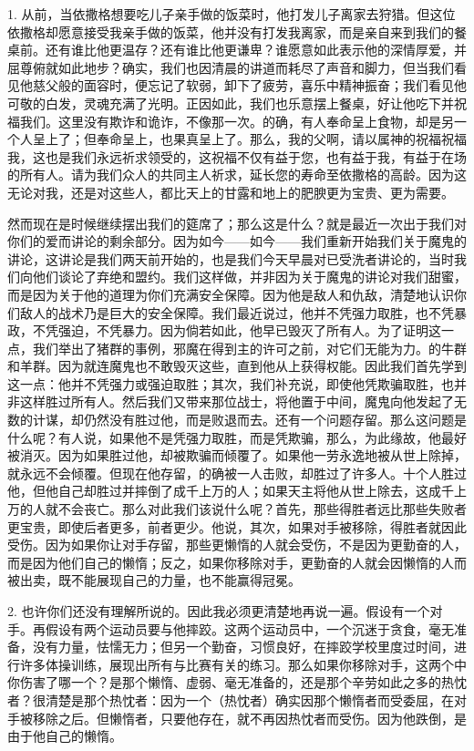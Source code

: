 1. 从前，当依撒格想要吃儿子亲手做的饭菜时，他打发儿子离家去狩猎。但这位依撒格却愿意接受我亲手做的饭菜，他并没有打发我离家，而是亲自来到我们的餐桌前。还有谁比他更温存？还有谁比他更谦卑？谁愿意如此表示他的深情厚爱，并屈尊俯就如此地步？确实，我们也因清晨的讲道而耗尽了声音和脚力，但当我们看见他慈父般的面容时，便忘记了软弱，卸下了疲劳，喜乐中精神振奋；我们看见他可敬的白发，灵魂充满了光明。正因如此，我们也乐意摆上餐桌，好让他吃下并祝福我们。这里没有欺诈和诡诈，不像那一次。的确，有人奉命呈上食物，却是另一个人呈上了；但奉命呈上，也果真呈上了。那么，我的父啊，请以属神的祝福祝福我，这也是我们永远祈求领受的，这祝福不仅有益于您，也有益于我，有益于在场的所有人。请为我们众人的共同主人祈求，延长您的寿命至依撒格的高龄。因为这无论对我，还是对这些人，都比天上的甘露和地上的肥腴更为宝贵、更为需要。\par

然而现在是时候继续摆出我们的筵席了；那么这是什么？就是最近一次出于我们对你们的爱而讲论的剩余部分。因为如今——如今——我们重新开始我们关于魔鬼的讲论，这讲论是我们两天前开始的，也是我们今天早晨对已受洗者讲论的，当时我们向他们谈论了弃绝和盟约。我们这样做，并非因为关于魔鬼的讲论对我们甜蜜，而是因为关于他的道理为你们充满安全保障。因为他是敌人和仇敌，清楚地认识你们敌人的战术乃是巨大的安全保障。我们最近说过，他并不凭强力取胜，也不凭暴政，不凭强迫，不凭暴力。因为倘若如此，他早已毁灭了所有人。为了证明这一点，我们举出了猪群的事例，邪魔在得到主的许可之前，对它们无能为力。的牛群和羊群。因为就连魔鬼也不敢毁灭这些，直到他从上获得权能。因此我们首先学到这一点：他并不凭强力或强迫取胜；其次，我们补充说，即使他凭欺骗取胜，也并非这样胜过所有人。然后我们又带来那位战士，将他置于中间，魔鬼向他发起了无数的计谋，却仍然没有胜过他，而是败退而去。还有一个问题存留。那么这问题是什么呢？有人说，如果他不是凭强力取胜，而是凭欺骗，那么，为此缘故，他最好被消灭。因为如果胜过他，却被欺骗而倾覆了。如果他一劳永逸地被从世上除掉，就永远不会倾覆。但现在他存留，的确被一人击败，却胜过了许多人。十个人胜过他，但他自己却胜过并摔倒了成千上万的人；如果天主将他从世上除去，这成千上万的人就不会丧亡。那么对此我们该说什么呢？首先，那些得胜者远比那些失败者更宝贵，即使后者更多，前者更少。他说，其次，如果对手被移除，得胜者就因此受伤。因为如果你让对手存留，那些更懒惰的人就会受伤，不是因为更勤奋的人，而是因为他们自己的懒惰；反之，如果你移除对手，更勤奋的人就会因懒惰的人而被出卖，既不能展现自己的力量，也不能赢得冠冕。\par

2. 也许你们还没有理解所说的。因此我必须更清楚地再说一遍。假设有一个对手。再假设有两个运动员要与他摔跤。这两个运动员中，一个沉迷于贪食，毫无准备，没有力量，怯懦无力；但另一个勤奋，习惯良好，在摔跤学校里度过时间，进行许多体操训练，展现出所有与比赛有关的练习。那么如果你移除对手，这两个中你伤害了哪一个？是那个懒惰、虚弱、毫无准备的，还是那个辛劳如此之多的热忱者？很清楚是那个热忱者：因为一个（热忱者）确实因那个懒惰者而受委屈，在对手被移除之后。但懒惰者，只要他存在，就不再因热忱者而受伤。因为他跌倒，是由于他自己的懒惰。\par

